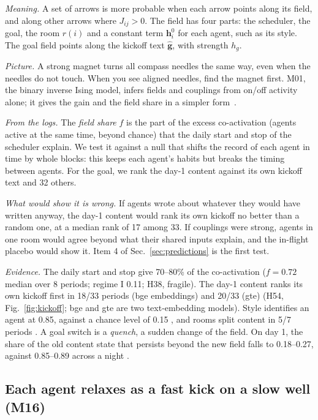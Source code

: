 \emph{Meaning.} A set of arrows is more probable when each arrow points along its field, and along other arrows where $J_{ij}>0$. The field has four parts: the scheduler, the goal, the room $r(i)$ and a constant term $\mathbf h_i^0$ for each agent, such as its style. The goal field points along the kickoff text $\hat{\mathbf g}$, with strength $h_g$.

\emph{Picture.} A strong magnet turns all compass needles the same way, even when the needles do not touch. When you see aligned needles, find the magnet first. M01, the binary inverse Ising model, infers fields and couplings from on/off activity alone; it gives the gain and the field share in a simpler form~\cite{schneidman2006,meshulam2019}.

\emph{From the logs.} The \emph{field share} $f$ is the part of the excess co-activation (agents active at the same time, beyond chance) that the daily start and stop of the scheduler explain. We test it against a null that shifts the record of each agent in time by whole blocks: this keeps each agent's habits but breaks the timing between agents. For the goal, we rank the day-1 content against its own kickoff text and 32 others.

\emph{What would show it is wrong.} If agents wrote about whatever they would have written anyway, the day-1 content would rank its own kickoff no better than a random one, at a median rank of 17 among 33. If couplings were strong, agents in one room would agree beyond what their shared inputs explain, and the in-flight placebo would show it. Item 4 of Sec.~\ref{sec:predictions} is the first test.

\emph{Evidence.} The daily start and stop give 70--80\% of the co-activation ($f=0.72$ median over 8 periods; regime I 0.11; H38, fragile). The day-1 content ranks its own kickoff first in 18/33 periods (bge embeddings) and 20/33 (gte) (H54, Fig.~\ref{fig:kickoff}; bge and gte are two text-embedding models). Style identifies an agent at 0.85, against a chance level of 0.15 , and rooms split content in 5/7 periods . A goal switch is a \emph{quench}, a sudden change of the field. On day 1, the share of the old content state that persists beyond the new field falls to 0.18--0.27, against 0.85--0.89 across a night .

\subsection{Each agent relaxes as a fast kick on a slow well (M16)}\label{sec:p16}

